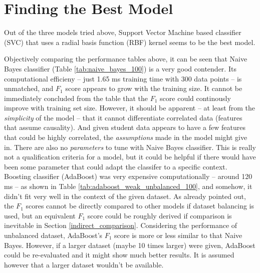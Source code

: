 \documentclass{article}
\begin{document}
	\section{Finding the Best Model}
	Out of the three models tried above, Support Vector Machine based classifier (SVC) that uses a radial basis function (RBF) kernel seems to be the best model. 
	
	Objectively comparing the performance tables above, it can be seen that Naive Bayes classifier (Table \ref{tab:naive_bayes_100}) is a very good contender. Its computational efficieny -- just 1.65 ms training time with 300 data points -- is unmatched, and $F_1$ score appears to grow with the training size. It cannot be immediately concluded from the table that the $F_1$ score could continously improve with training set size. However, it should be apparent -- at least from the \emph{simplicity} of the model -- that it cannot differentiate correlated data (features that assume causality). And given student data appears to have a few features that could be highly correlated, the \emph{assumptions} made in the model might give in. There are also no \emph{parameters} to tune with Naive Bayes classifier. This is really not a qualification criteria for a model, but it could be helpful if there would have been some parameter that could adapt the classifer to a specific context. Boosting classifier (AdaBoost) was very expensive computationally -- around 120 ms -- as shown in Table \ref{tab:adaboost_weak_unbalanced_100}, and somehow, it didn't fit very well in the context of the given dataset. As already pointed out, the $F_1$ scores cannot be directly compared to other models if dataset balancing is used, but an equivalent $F_1$ score could be roughly derived if comparison is inevitable in Section \ref{indirect_comparison}. Considering the performance of unbalanced dataset, AdaBoost's $F_1$ score is more or less similar to that Naive Bayes. However, if a larger dataset (maybe 10 times larger) were given, AdaBoost could be re-evaluated and it might show much better results. It is assumed however that a larger dataset wouldn't be available. 
	
\end{document}
